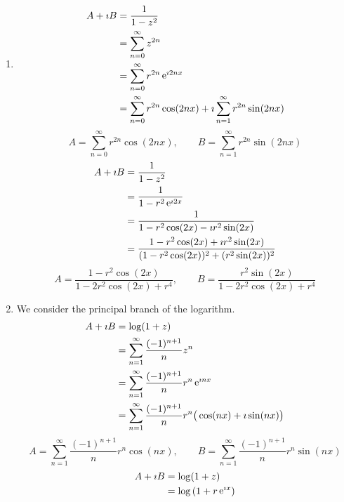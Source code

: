 {%
\begin{Solution}
  \begin{enumerate}
  \item
    \begin{align*}
      A + \imath B
      &= \frac{1}{1-z^2} \\
      &= \sum_{n = 0}^\infty z^{2n} \\
      &= \sum_{n = 0}^\infty r^{2n} \mathop{\mathrm{e}}\nolimits^{\imath 2 n x} \\
      &= \sum_{n = 0}^\infty r^{2n} \cos(2 n x) + \imath \sum_{n = 1}^\infty r^{2n} \sin(2 n x)
    \end{align*}
    \[
    \boxed{
      A = \sum_{n = 0}^\infty r^{2n} \cos(2 n x), \qquad
      B = \sum_{n = 1}^\infty r^{2n} \sin(2 n x)
      }
    \]
    \begin{align*}
      A + \imath B
      &= \frac{1}{1-z^2} \\
      &= \frac{1}{ 1 - r^2 \mathop{\mathrm{e}}\nolimits^{\imath 2 x} } \\
      &= \frac{1}{ 1 - r^2 \cos(2 x) - \imath r^2 \sin(2 x) } \\
      &= \frac{1 - r^2 \cos(2 x) + \imath r^2 \sin(2 x) }
      { ( 1 - r^2 \cos(2 x) )^2 + ( r^2 \sin (2 x) )^2 }
    \end{align*}
    \[
    \boxed{
      A = \frac{1 - r^2 \cos(2 x) }{ 1 - 2 r^2 \cos(2 x) + r^4 }, \qquad
      B = \frac{ r^2 \sin(2 x) }{ 1 - 2 r^2 \cos(2 x) + r^4 }
      }
    \]
  \item
    We consider the principal branch of the logarithm.
    \begin{align*}
      A + \imath B
      &= \log(1 + z) \\
      &= \sum_{n = 1}^\infty \frac{ (-1)^{n+1} }{ n } z^n \\
      &= \sum_{n = 1}^\infty \frac{ (-1)^{n+1} }{ n } r^n \mathop{\mathrm{e}}\nolimits^{\imath n x} \\
      &= \sum_{n = 1}^\infty \frac{ (-1)^{n+1} }{ n } r^n 
      \big( \cos(n x) + \imath \sin(n x) \big)
    \end{align*}
    \[
    \boxed{
      A = \sum_{n = 1}^\infty \frac{ (-1)^{n+1} }{ n } r^n \cos(n x), \qquad
      B = \sum_{n = 1}^\infty \frac{ (-1)^{n+1} }{ n } r^n \sin(n x)
      }
    \]
    \begin{align*}
      A + \imath B
      &= \log(1 + z) \\
      &= \log \left(1 + r \e^{\imath x} \right) \\

\end{align*}
\end{enumerate}
\end{Solution}}

